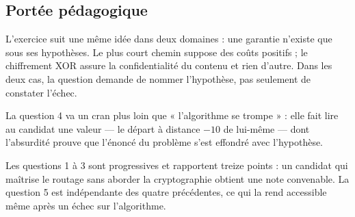\subsection*{Portée pédagogique}

L'exercice suit une même idée dans deux domaines : une garantie n'existe que
sous ses hypothèses. Le plus court chemin suppose des coûts positifs ; le
chiffrement XOR assure la confidentialité du contenu et rien d'autre. Dans les
deux cas, la question demande de nommer l'hypothèse, pas seulement de constater
l'échec.

La question 4 va un cran plus loin que « l'algorithme se trompe » : elle fait
lire au candidat une valeur — le départ à distance $-10$ de lui-même — dont
l'absurdité prouve que l'énoncé du problème s'est effondré avec l'hypothèse.

Les questions 1 à 3 sont progressives et rapportent treize points : un candidat
qui maîtrise le routage sans aborder la cryptographie obtient une note
convenable. La question 5 est indépendante des quatre précédentes, ce qui la
rend accessible même après un échec sur l'algorithme.
